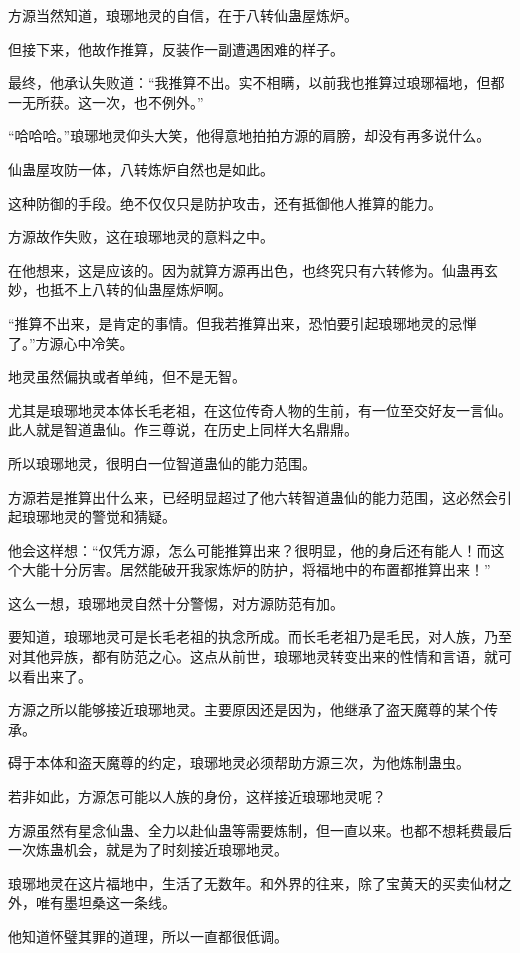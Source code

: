 \begin{this_body}
方源当然知道，琅琊地灵的自信，在于八转仙蛊屋炼炉。

但接下来，他故作推算，反装作一副遭遇困难的样子。

最终，他承认失败道：“我推算不出。实不相瞒，以前我也推算过琅琊福地，但都一无所获。这一次，也不例外。”

“哈哈哈。”琅琊地灵仰头大笑，他得意地拍拍方源的肩膀，却没有再多说什么。

仙蛊屋攻防一体，八转炼炉自然也是如此。

这种防御的手段。绝不仅仅只是防护攻击，还有抵御他人推算的能力。

方源故作失败，这在琅琊地灵的意料之中。

在他想来，这是应该的。因为就算方源再出色，也终究只有六转修为。仙蛊再玄妙，也抵不上八转的仙蛊屋炼炉啊。

“推算不出来，是肯定的事情。但我若推算出来，恐怕要引起琅琊地灵的忌惮了。”方源心中冷笑。

地灵虽然偏执或者单纯，但不是无智。

尤其是琅琊地灵本体长毛老祖，在这位传奇人物的生前，有一位至交好友一言仙。此人就是智道蛊仙。作三尊说，在历史上同样大名鼎鼎。

所以琅琊地灵，很明白一位智道蛊仙的能力范围。

方源若是推算出什么来，已经明显超过了他六转智道蛊仙的能力范围，这必然会引起琅琊地灵的警觉和猜疑。

他会这样想：“仅凭方源，怎么可能推算出来？很明显，他的身后还有能人！而这个大能十分厉害。居然能破开我家炼炉的防护，将福地中的布置都推算出来！”

这么一想，琅琊地灵自然十分警惕，对方源防范有加。

要知道，琅琊地灵可是长毛老祖的执念所成。而长毛老祖乃是毛民，对人族，乃至对其他异族，都有防范之心。这点从前世，琅琊地灵转变出来的性情和言语，就可以看出来了。

方源之所以能够接近琅琊地灵。主要原因还是因为，他继承了盗天魔尊的某个传承。

碍于本体和盗天魔尊的约定，琅琊地灵必须帮助方源三次，为他炼制蛊虫。

若非如此，方源怎可能以人族的身份，这样接近琅琊地灵呢？

方源虽然有星念仙蛊、全力以赴仙蛊等需要炼制，但一直以来。也都不想耗费最后一次炼蛊机会，就是为了时刻接近琅琊地灵。

琅琊地灵在这片福地中，生活了无数年。和外界的往来，除了宝黄天的买卖仙材之外，唯有墨坦桑这一条线。

他知道怀璧其罪的道理，所以一直都很低调。


\end{this_body}
